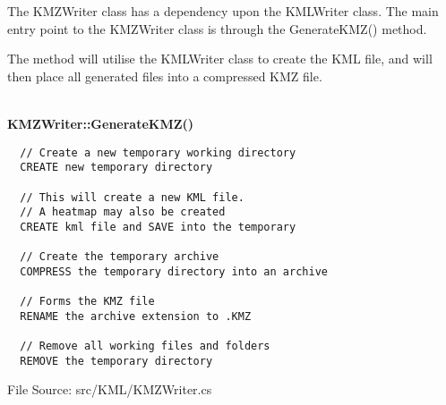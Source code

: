 The KMZWriter class has a dependency upon the KMLWriter class. The main entry 
point to the KMZWriter class is through the {\ttfamily GenerateKMZ()} method.

The method will utilise the KMLWriter class to create the KML file, and will 
then place all generated files into a compressed KMZ file.

~\\
{\bfseries KMZWriter::GenerateKMZ()}
\lstset{style=pseudocode}
\begin{lstlisting}
  // Create a new temporary working directory
  CREATE new temporary directory

  // This will create a new KML file.
  // A heatmap may also be created
  CREATE kml file and SAVE into the temporary

  // Create the temporary archive
  COMPRESS the temporary directory into an archive

  // Forms the KMZ file
  RENAME the archive extension to .KMZ

  // Remove all working files and folders
  REMOVE the temporary directory
\end{lstlisting}
{\textsf \footnotesize File Source: src/KML/KMZWriter.cs }
